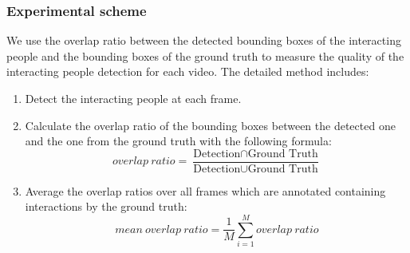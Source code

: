\subsubsection*{Experimental scheme}
We use the overlap ratio between the detected bounding boxes of the interacting people and the bounding boxes of the ground truth to measure the quality of the interacting people detection for each video. The detailed method includes: 
\begin{enumerate}
	\item Detect the interacting people at each frame.
	\item Calculate the overlap ratio of the bounding boxes between the detected one and the one from the ground truth with the following formula:
	\begin{equation}
		overlap\ ratio = \frac{\text{Detection} \cap \text{Ground Truth}}{\text{Detection} \cup \text{Ground Truth}}
	\end{equation}
	\item Average the overlap ratios over all frames which are annotated containing interactions by the ground truth:
	\begin{equation}
		mean \ overlap\ ratio = \frac{1}{M}\sum_{i=1}^{M} overlap\ ratio
	\end{equation}
\end{enumerate} 
